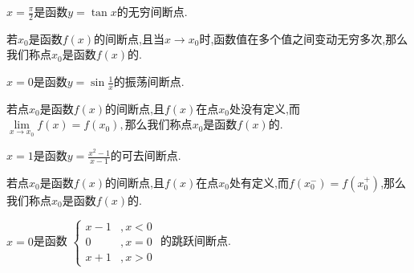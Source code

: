 \simpleexamples $\displaystyle x=\frac{\pi}{2}$是函数$y=\tan x$的无穷间断点.

若$x_0$是函数$f(x)$的间断点,且当$x \to x_0$时,函数值在多个值之间变动无穷多次,那么我们称点$x_0$是函数$f(x)$的.\jg

\simpleexamples $\displaystyle x = 0$是函数$\displaystyle y =\sin\frac{1}{x}$的振荡间断点.


若点$x_0$是函数$f(x)$的间断点,且$f(x)$在点$x_0$处没有定义,而$\lim\limits_{x \to x_0}f(x)=f(x_0),$那么我们称点$x_0$是函数$f(x)$的.\jg

\simpleexamples $\displaystyle x=1$是函数$\displaystyle y=\frac{x^2-1}{x-1}$的可去间断点.

若点$x_0$是函数$f(x)$的间断点,且$f(x)$在点$x_0$处有定义,而$f(x_0^-)=f(x_0^+)$,那么我们称点$x_0$是函数$f(x)$的.

\simpleexamples $\displaystyle x=0$是函数
$
\displaystyle
\begin{cases}
x-1&,x<0\\
0&,x=0\\
x+1&,x>0
\end{cases}
$
的跳跃间断点.

